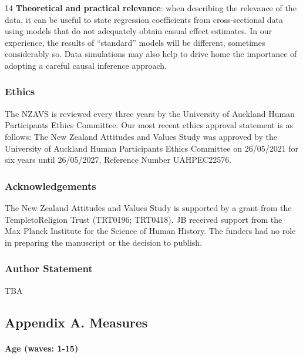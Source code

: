\documentclass[
  singlecolumn]{article}
\let\oldparagraph\paragraph
\renewcommand{\paragraph}[1]{\oldparagraph{#1}\mbox{}}
\begin{document}
14 \textbf{Theoretical and practical relevance}: when describing the
relevance of the data, it can be useful to state regression coefficients
from cross-sectional data using models that do not adequately obtain
casual effect estimates. In our experience, the results of ``standard''
models will be different, sometimes considerably so. Data simulations
may also help to drive home the importance of adopting a careful causal
inference approach.

\newpage{}

\subsubsection{Ethics}\label{ethics}

The NZAVS is reviewed every three years by the University of Auckland
Human Participants Ethics Committee. Our most recent ethics approval
statement is as follows: The New Zealand Attitudes and Values Study was
approved by the University of Auckland Human Participants Ethics
Committee on 26/05/2021 for six years until 26/05/2027, Reference Number
UAHPEC22576.

\subsubsection{Acknowledgements}\label{acknowledgements}

The New Zealand Attitudes and Values Study is supported by a grant from
the TempletoReligion Trust (TRT0196; TRT0418). JB received support from
the Max Planck Institute for the Science of Human History. The funders
had no role in preparing the manuscript or the decision to publish.

\subsubsection{Author Statement}\label{author-statement}

TBA

\newpage{}

\subsection{Appendix A. Measures}\label{appendix-a.-measures}

\paragraph{Age (waves: 1-15)}\label{age-waves-1-15}
\end{document}
